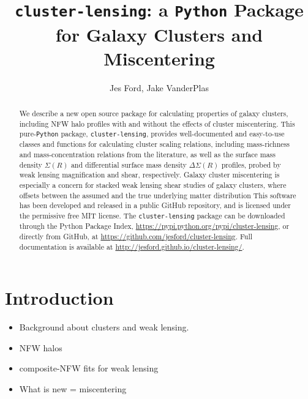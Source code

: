 \documentclass[iop]{emulateapj}
\begin{document}
\title{\MakeLowercase{\lstinline{cluster-lensing}}: a \lstinline{P}\MakeLowercase{\lstinline{ython}} Package for Galaxy Clusters and Miscentering}
\author{
Jes Ford,  
Jake VanderPlas
}



\begin{abstract}
We describe a new open source package for calculating properties of galaxy clusters, including NFW halo profiles with and without the effects of cluster miscentering. This pure-\lstinline{Python} package, \lstinline{cluster-lensing}, provides well-documented and easy-to-use classes and functions for calculating cluster scaling relations, including mass-richness and mass-concentration relations from the literature, as well as the surface mass density $\Sigma(R)$ and differential surface mass density $\Delta\Sigma(R)$ profiles, probed by weak lensing magnification and shear, respectively. Galaxy cluster miscentering is especially a concern for stacked weak lensing shear studies of galaxy clusters, where offsets between the assumed and the true underlying matter distribution
This software has been developed and released in a public GitHub repository, and is licensed under the permissive free MIT license. The \lstinline{cluster-lensing} package can be downloaded through the Python Package Index, \url{https://pypi.python.org/pypi/cluster-lensing}, or directly from GitHub, at \url{https://github.com/jesford/cluster-lensing}. Full documentation is available at \url{http://jesford.github.io/cluster-lensing/}.
\end{abstract}


\setcounter{section}{0}
\setcounter{subsection}{0}
\setcounter{subsubsection}{0}

\section{Introduction}
\label{intro}

\begin{itemize} \itemsep -2pt
\item Background about clusters and weak lensing.
\item NFW halos \citep{nfw97, Wright00}
\item composite-NFW fits for weak lensing \citep{Ford12, Ford14, Ford15}
\item What is new = miscentering \citep{Johnston07, George12, Ford14, Ford15}
\end{itemize}
\end{document}
